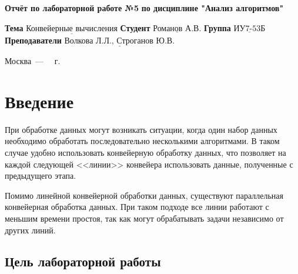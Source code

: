 \documentclass[12pt]{report}
\begin{document}
\begin{titlepage}
	
	\begin{center}
		\noindent\begin{minipage}{1.3\textwidth}\centering
			\Large\textbf{  Отчёт по лабораторной работе №5}\newline
			\textbf{по дисциплине "Анализ алгоритмов"}\newline\newline
		\end{minipage}
	\end{center}
	
	\noindent\textbf{Тема} $\underline{\text{Конвейерные вычисления}}$\newline\newline
	\noindent\textbf{Студент} $\underline{\text{Романов А.В.}}$\newline\newline
	\noindent\textbf{Группа} $\underline{\text{ИУ7-53Б}}$\newline\newline
	\noindent\textbf{Преподаватели} $\underline{\text{Волкова Л.Л., Строганов Ю.В.}}$\newline\newline\newline
	
	\begin{center}
		\vfill
		Москва~---~\the\year
		~г.
	\end{center}
\end{titlepage}


\tableofcontents

\newpage
\chapter*{Введение}

При обработке данных могут возникать ситуации, когда один набор данных необходимо обработать последовательно несколькими алгоритмами. В таком случае удобно использовать конвейерную обработку данных, что позволяет на каждой следующей <<линии>> конвейера использовать данные, полученные с предыдущего этапа. 

Помимо линейной конвейерной обработки данных, существуют параллельная конвейерная обработка данных. При таком подходе все линии работают с меньшим времени простоя, так как могут обрабатывать задачи независимо от других линий.

\section*{Цель лабораторной работы}
\end{document}
